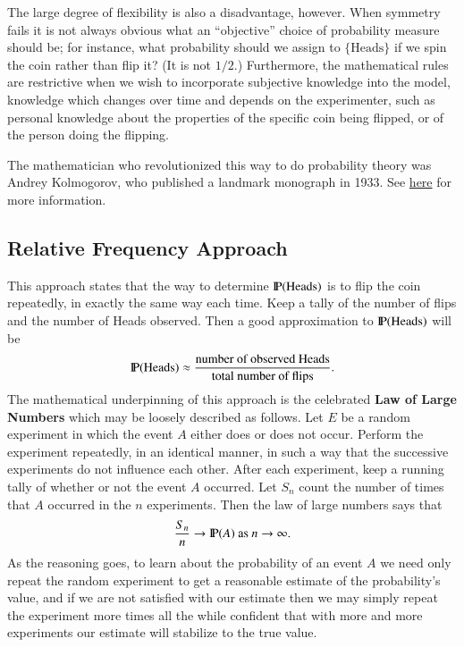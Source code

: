 \documentclass[captions=tableheading]{scrbook}
\begin{document}
The large degree of flexibility is also a disadvantage, however. When symmetry fails it is not always obvious what an ``objective'' choice of probability measure should be; for instance, what probability should we assign to \( \{ \mbox{Heads} \} \) if we spin the coin rather than flip it? (It is not \(1/2\).) Furthermore, the mathematical rules are restrictive when we wish to incorporate subjective knowledge into the model, knowledge which changes over time and depends on the experimenter, such as personal knowledge about the properties of the specific coin being flipped, or of the person doing the flipping.

The mathematician who revolutionized this way to do probability theory was Andrey Kolmogorov, who published a landmark monograph in 1933. See \href{http://www-history.mcs.st-andrews.ac.uk/Mathematicians/Kolmogorov.html}{here} for more information.
\subsection{Relative Frequency Approach}
\label{sec-4-3-2}


This approach states that the way to determine \(\P(\mbox{Heads})\) is to flip the coin repeatedly, in exactly the same way each time. Keep a tally of the number of flips and the number of Heads observed. Then a good approximation to \(\P(\mbox{Heads})\) will be
\begin{equation} 
\P(\mbox{Heads})\approx\frac{\mbox{number of observed Heads}}{\mbox{total number of flips}}.
\end{equation}
The mathematical underpinning of this approach is the celebrated \textbf{Law of Large Numbers} which may be loosely described as follows. Let \(E\) be a random experiment in which the event \(A\) either does or does not occur. Perform the experiment repeatedly, in an identical manner, in such a way that the successive experiments do not influence each other. After each experiment, keep a running tally of whether or not the event \(A\) occurred. Let \(S_{n}\) count the number of times that \(A\) occurred in the \(n\) experiments. Then the law of large numbers says that 
\begin{equation}
\frac{S_{n}}{n}\to\P(A)\mbox{ as }n\to\infty.
\end{equation}
As the reasoning goes, to learn about the probability of an event \(A\) we need only repeat the random experiment to get a reasonable estimate of the probability's value, and if we are not satisfied with our estimate then we may simply repeat the experiment more times all the while confident that with more and more experiments our estimate will stabilize to the true value. 
\end{document}
